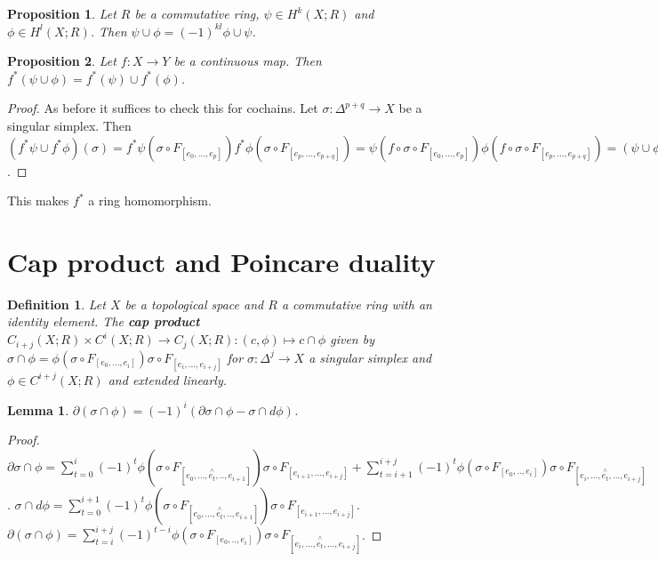 \documentclass{report}
\newtheorem{definition}{Definition}
\newtheorem{lemma}{Lemma}
\newtheorem{proposition}{Proposition}
\begin{document}
\begin{proposition}
Let $R$ be a commutative ring, $\psi\in H^k(X;R)$ and $\phi\in H^l(X;R)$. Then $\psi\cup\phi=(-1)^{kl}\phi\cup\psi$.
\end{proposition}

\begin{proposition}
Let $f\colon X\to Y$ be a continuous map. Then $f^*(\psi\cup\phi)=f^*(\psi)\cup f^*(\phi)$.
\end{proposition}
\begin{proof}
As before it suffices to check this for cochains. Let $\sigma\colon\Delta^{p+q}\to X$ be a singular simplex. Then $(f^*\psi\cup f^*\phi)(\sigma)=f^*\psi(\sigma\circ F_{[e_0,...,e_p]})f^*\phi(\sigma\circ F_{[e_p,...,e_{p+q}]})=\psi(f\circ\sigma\circ F_{[e_0,...,e_p]})\phi(f\circ\sigma\circ F_{[e_p,...,e_{p+q}]})=(\psi\cup\phi)(f\circ\sigma)=f^*(\psi\cup\phi)(\sigma)$.
\end{proof}

\noindent This makes $f^*$ a ring homomorphism.

\section{Cap product and Poincare duality}

\begin{definition}
Let $X$ be a topological space and $R$ a commutative ring with an identity element. The \textbf{cap product} $C_{i+j}(X;R)\times C^i(X;R)\to C_j(X;R):(c,\phi)\mapsto c\cap\phi$ given by $\sigma\cap\phi=\phi(\sigma\circ F_{[e_0,...,e_i]})\sigma\circ F_{[e_i,...,e_{i+j}]}$ for $\sigma\colon\Delta^j\to X$ a singular simplex and $\phi\in C^{i+j}(X;R)$ and extended linearly.
\end{definition}

\begin{lemma}
$\partial(\sigma\cap\phi)=(-1)^i(\partial\sigma\cap\phi-\sigma\cap d\phi)$.
\end{lemma}
\begin{proof}
$\partial\sigma\cap\phi=\sum_{t=0}^i(-1)^t\phi(\sigma\circ F_{[e_0,...,\overset{\wedge}{e_t},..,e_{i+1}]})\sigma\circ F_{[e_{i+1},...,e_{i+j}]}+\sum_{t=i+1}^{i+j}(-1)^t\phi(\sigma\circ F_{[e_0,..,e_{i}]})\sigma\circ F_{[e_{i},...,\overset{\wedge}{e_t},...,e_{i+j}]}$.
$\sigma\cap d\phi=\sum_{t=0}^{i+1}(-1)^t\phi(\sigma\circ F_{[e_0,...,\overset{\wedge}{e_t},..,e_{i+1}]})\sigma\circ F_{[e_{i+1},...,e_{i+j}]}$.
$\partial(\sigma\cap\phi)=\sum_{t=i}^{i+j}(-1)^{t-i}\phi(\sigma\circ F_{[e_0,..,e_{i}]})\sigma\circ F_{[e_{i},...,\overset{\wedge}{e_t},...,e_{i+j}]}$.
\end{proof}
\end{document}
